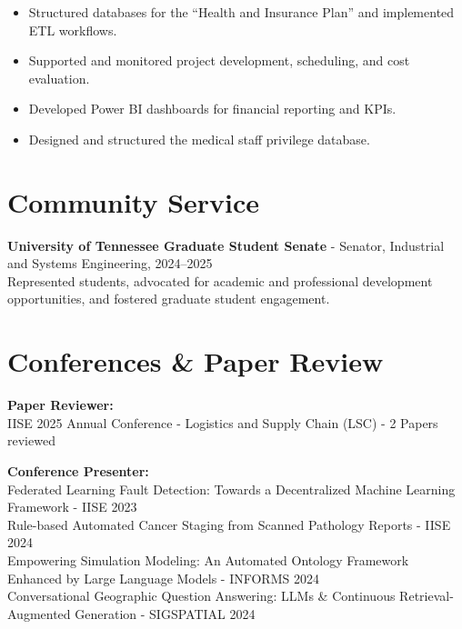 \documentclass[10pt, letterpaper]{article}
\newenvironment{highlights}{
    \begin{itemize}[
        topsep=0.10 cm,
        parsep=0.10 cm,
        partopsep=0pt,
        itemsep=0pt,
        leftmargin=0 cm + 10pt
    ]
}{
    \end{itemize}
} %
\begin{document}
\begin{highlights}
    \item Structured databases for the “Health and Insurance Plan” and implemented ETL workflows.
    \item Supported and monitored project development, scheduling, and cost evaluation.
    \item Developed Power BI dashboards for financial reporting and KPIs.
    \item Designed and structured the medical staff privilege database.
\end{highlights}






\section*{Community Service}

\textbf{University of Tennessee Graduate Student Senate} - Senator, Industrial and Systems Engineering, 2024–2025\\  

\small
Represented students, advocated for academic and professional development opportunities, and fostered graduate student engagement.




\section*{Conferences \& Paper Review}
\small
\textbf{Paper Reviewer:}\\
IISE 2025 Annual Conference - Logistics and Supply Chain (LSC) - 2 Papers reviewed

\vspace{0.5cm}
\textbf{Conference Presenter:}\\
Federated Learning Fault Detection: Towards a Decentralized Machine Learning Framework - IISE 2023\\
\vspace{0.3cm}
Rule-based Automated Cancer Staging from Scanned Pathology Reports - IISE 2024\\
\vspace{0.3cm}
Empowering Simulation Modeling: An Automated Ontology Framework Enhanced by Large Language Models - INFORMS 2024\\
\vspace{0.3cm}
Conversational Geographic Question Answering: LLMs \& Continuous Retrieval-Augmented Generation - SIGSPATIAL 2024\\
\vspace{0.3cm}
\end{document}

